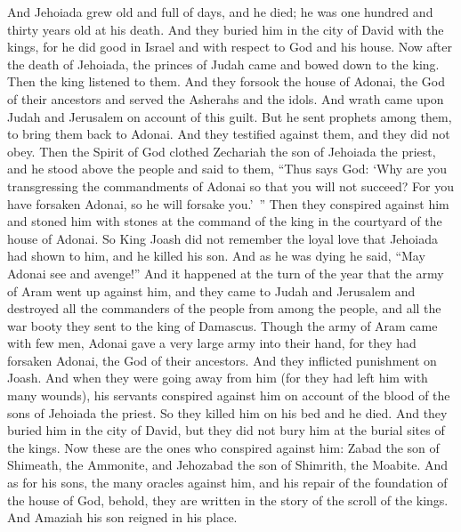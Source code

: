 \begin{biblechapter}
\verse And Jehoiada grew old and full of days, and he died; he was one hundred and thirty years old at his death.
\verse And they buried him in the city of David with the kings, for he did good in Israel and with respect to God and his house.
\verse Now after the death of Jehoiada, the princes of Judah came and bowed down to the king. Then the king listened to them.
\verse And they forsook the house of Adonai, the God of their ancestors and served the Asherahs and the idols. And wrath came upon Judah and Jerusalem on account of this guilt.
\verse But he sent prophets among them, to bring them back to Adonai. And they testified against them, and they did not obey.
\verse Then the Spirit of God clothed Zechariah the son of Jehoiada the priest, and he stood above the people and said to them, “Thus says God: ‘Why are you transgressing the commandments of Adonai so that you will not succeed? For you have forsaken Adonai, so he will forsake you.’ ”
\verse Then they conspired against him and stoned him with stones at the command of the king in the courtyard of the house of Adonai.
\verse So King Joash did not remember the loyal love that Jehoiada had shown to him, and he killed his son. And as he was dying he said, “May Adonai see and avenge!”
 And it happened at the turn of the year that the army of Aram went up against him, and they came to Judah and Jerusalem and destroyed all the commanders of the people from among the people, and all the war booty they sent to the king of Damascus.
\verse Though the army of Aram came with few men, Adonai gave a very large army into their hand, for they had forsaken Adonai, the God of their ancestors. And they inflicted punishment on Joash.
\verse And when they were going away from him (for they had left him with many wounds), his servants conspired against him on account of the blood of the sons of Jehoiada the priest. So they killed him on his bed and he died. And they buried him in the city of David, but they did not bury him at the burial sites of the kings.
\verse Now these are the ones who conspired against him: Zabad the son of Shimeath, the Ammonite, and Jehozabad the son of Shimrith, the Moabite.
\verse And as for his sons, the many oracles against him, and his repair of the foundation of the house of God, behold, they are written in the story of the scroll of the kings. And Amaziah his son reigned in his place.
\end{biblechapter}

